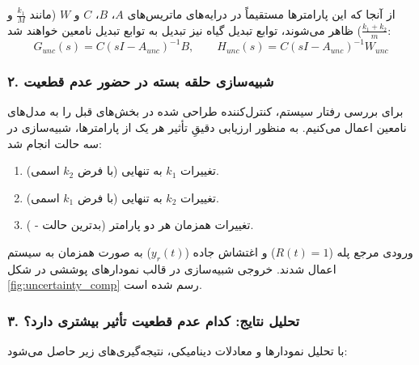 \documentclass[a4paper]{article}
\begin{document}
از آنجا که این پارامترها مستقیماً در درایه‌های ماتریس‌های $A$، $B$، $C$ و $W$ (مانند $\frac{k_1}{M}$ و $\frac{k_1+k_2}{m}$) ظاهر می‌شوند، توابع تبدیل گیاه نیز تبدیل به توابع تبدیل نامعین  خواهند شد:
\begin{equation}
	G_{unc}(s) = C(sI - A_{unc})^{-1}B, \qquad H_{unc}(s) = C(sI - A_{unc})^{-1}W_{unc}
\end{equation}

\subsubsection*{۲. شبیه‌سازی حلقه بسته در حضور عدم قطعیت}
برای بررسی رفتار سیستم، کنترل‌کننده  طراحی شده در بخش‌های قبل را به مدل‌های نامعین اعمال می‌کنیم. به منظور ارزیابی دقیقِ تأثیر هر یک از پارامترها، شبیه‌سازی در سه حالت انجام شد:
\begin{enumerate}
	\item تغییرات $k_1$ به تنهایی (با فرض $k_2$ اسمی).
	\item تغییرات $k_2$ به تنهایی (با فرض $k_1$ اسمی).
	\item تغییرات همزمان هر دو پارامتر (بدترین حالت - ).
\end{enumerate}
ورودی مرجع پله ($R(t)=1$) و اغتشاش جاده ($y_r(t)$) به صورت همزمان به سیستم اعمال شدند. خروجی شبیه‌سازی در قالب نمودارهای پوششی  در شکل \ref{fig:uncertainty_comp} رسم شده است.

\subsubsection*{۳. تحلیل نتایج: کدام عدم قطعیت تأثیر بیشتری دارد؟}
با تحلیل نمودارها و معادلات دینامیکی، نتیجه‌گیری‌های زیر حاصل می‌شود:
\end{document}
